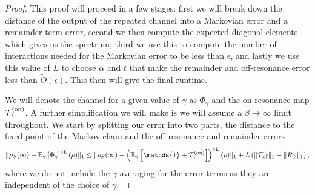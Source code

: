 \documentclass{article}
\newcommand{\on}{\rm on}
\newcommand{\off}{\rm off}
\newcommand{\norm}[1]{\| #1 \|}
\newcommand{\EE}{\mathbb{E}}
\newcommand{\bigotilde}[1]{\widetilde{O} \left( #1 \right)}
\newcommand{\identity}{\mathds{1}}
\begin{document}
\begin{proof}
    This proof will proceed in a few stages: first we will break down the distance of the output of the repeated channel into a Markovian error and a remainder term error, second we then compute the expected diagonal elements which gives us the spectrum, third we use this to compute the number of interactions needed for the Markovian error to be less than $\epsilon$, and lastly we use this value of $L$ to choose $\alpha$ and $t$ that make the remainder and off-resonance error less than $\bigotilde{\epsilon}$. This then will give the final runtime.
    
    We will denote the channel for a given value of $\gamma$ as $\Phi_{\gamma}$ and the on-resonance map $\mathcal{T}_{\gamma}^{(\on)}$. A further simplification we will make is we will assume a $\beta \to \infty$ limit throughout. We start by splitting our error into two parts, the distance to the fixed point of the Markov chain and the off-resonance and remainder errors
\begin{align}
    \norm{\rho_S(\infty) - \EE_\gamma \left[\Phi_{\gamma}\right]^{\circ L} (\rho)}_1 \le \norm{\rho_S(\infty) - \left(\EE_{\gamma}\left[  \identity + \mathcal{T}_\gamma^{(\on)}  \right] \right)^{\circ L}(\rho)}_1 + L \left(\norm{\mathcal{T}_{\off}}_1 + \norm{R_{\Phi}}_1\right),
\end{align}
where we do not include the $\gamma$ averaging for the error terms as they are independent of the choice of $\gamma$.


\end{proof}
\end{document}

